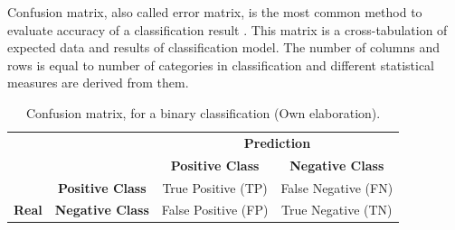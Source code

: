 Confusion matrix, also called error matrix, is the most common method to evaluate accuracy of a classification result \cite{Reference61}. This matrix is a cross-tabulation of expected data and results of classification model. The number of columns and rows is equal to number of categories in classification and different statistical measures are derived from them.

\begin{table}[H]

\centering
\begin{center}
\begin{tabular}{ll|c|c|}
\cline{3-4}
                                                        &                                              & \multicolumn{2}{c|}{\textbf{Prediction}}                                                          \\ \cline{3-4} 
                                                        &                                              & \textbf{Positive Class}                         & \textbf{Negative Class}                         \\ \hline
\multicolumn{1}{|c|}{}                                  & \multicolumn{1}{c|}{\textbf{Positive Class}} & \cellcolor[HTML]{AADD99}True Positive (TP) & \cellcolor[HTML]{FFCE93}False Negative (FN)     \\ \cline{2-4} 
\multicolumn{1}{|c|}{\multirow{-2}{*}{\textbf{Real}}} & \multicolumn{1}{c|}{\textbf{Negative Class}} & \cellcolor[HTML]{DF9F9F}False Positive (FP)     & \cellcolor[HTML]{AADD99}True Negative (TN) \\ \hline
\end{tabular}
\caption{Confusion matrix, for a binary classification (Own elaboration).}
\label{table:matriz}
\end{center}
\end{table}

\vspace{5mm} %

